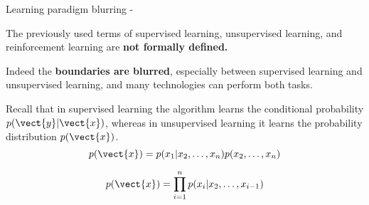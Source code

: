 %
%
%

\begin{frame}[t,allowframebreaks]{
    Learning paradigm blurring - }

    The previously used terms of
    \gls{supervised learning},
    \gls{unsupervised learning}, and
    \gls{reinforcement learning}
    are {\bf not formally defined.}\\
    \vspace{0.2cm}

    Indeed the {\bf boundaries are blurred}, especially between
    \gls{supervised learning} and \gls{unsupervised learning},
    and many technologies can perform both tasks.\\
    \vspace{0.2cm}

    Recall that in \gls{supervised learning} the algorithm learns
    the conditional probability $p(\vect{y}|\vect{x})$, whereas in
    \gls{unsupervised learning} it learns the 
    probability distribution  $p(\vect{x})$.\\

    \begin{equation}
        p(\vect{x}) = p(x_1 | x_2, \dots, x_n) p(x_2, \dots, x_n)
    \end{equation}

    \begin{equation}
        p(\vect{x}) = \prod_{i=1}^{n} p(x_i | x_2, \dots, x_{i-1})
    \end{equation}

\end{frame}